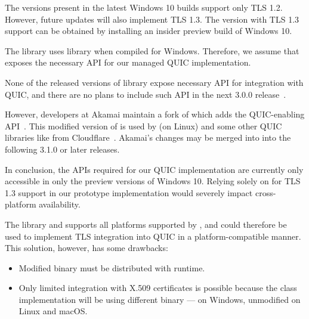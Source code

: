 \begin{description}

     The \libschannel{} versions present in the latest Windows 10
builds support only TLS 1.2. However, future updates will also implement TLS 1.3. The \libschannel{}
version with TLS 1.3 support can be obtained by installing an insider preview build of Windows 10.

    The \libmsquic{} library uses \libschannel{} library when compiled for Windows. Therefore, we
assume that \libschannel{} exposes the necessary API for our managed QUIC implementation.

    \ditem{\libopenssl{}} None of the released versions of \libopenssl{} library expose necessary
API for integration with QUIC, and there are no plans to include such API in the next \libopenssl{}
3.0.0 release~\cite{OpensslBlogNoQuic}.

    However, developers at Akamai maintain a fork of \libopenssl{} which adds the QUIC-enabling
API~\cite{AkamaiOpensslGithub}. This modified version of \libopenssl{} is used by \libmsquic{} (on
Linux) and some other QUIC libraries like  from Cloudflare~\cite{quicheGithub}.
Akamai's changes may be merged into \libopenssl{} into the following 3.1.0 or later releases.

\end{description}

In conclusion, the APIs required for our QUIC implementation are currently only accessible in only
the preview versions of Windows 10. Relying solely on \libschannel{} for TLS 1.3 support in our
prototype implementation would severely impact cross-platform availability.

The \libopenssl{} library and supports all platforms supported by \dotnet{}, and could therefore be
used to implement TLS integration into QUIC in a platform-compatible manner. This solution, however,
has some drawbacks:

\begin{itemize}

  \item Modified \libopenssl{} binary must be distributed with \dotnet{} runtime.

  \item Only limited integration with X.509 certificates is possible because the
 class implementation will be using different binary --- 
on Windows, unmodified \libopenssl{} on Linux and macOS\@.

\end{itemize}

